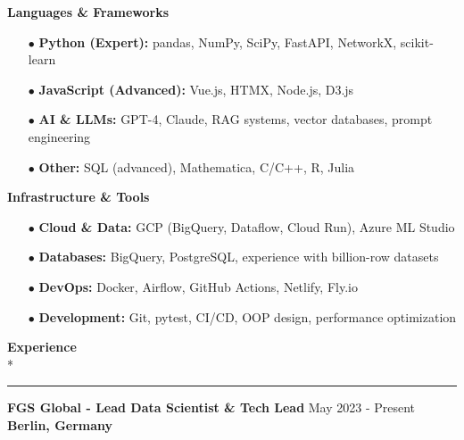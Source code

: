 \documentclass[11pt,a4paper]{article}
\newlength{\spacesm}    \setlength{\spacesm}{11pt}     %
\newlength{\spacexl}    \setlength{\spacexl}{38pt}     %
\newcommand{\bodytext}[1]{%
    {\fontsize{10pt}{14pt}\selectfont\color{charcoal} #1}%
}
\newcommand{\bodytextbold}[1]{%
    {\fontsize{10pt}{14pt}\selectfont\color{charcoal}\bfseries #1}%
}
\newcommand{\microtext}[1]{%
    {\fontsize{8pt}{11pt}\selectfont\color{mediumgray} #1}%
}
\newcommand{\sectiontitle}[1]{%
    \needspace{4\baselineskip}%
    \vspace{\spacexl}%
    {\fontsize{12pt}{14pt}\selectfont\color{navy}\bfseries #1}\\*%
    \vspace{1pt}%
    {\color{coral}\rule{20pt}{1pt}}%
    \vspace{0pt}%
}
\newcommand{\coralbullet}{{\color{coral}$\bullet$}\space}
\newcommand{\jobduration}[1]{%
    {\fontspec{JetBrains Mono}\microtext{#1}}
}
\newcommand{\companyname}[1]{%
    {\color{darkgray}\bfseries #1}
}
\begin{document}
\setlength{\multicolsep}{0pt}
\begin{multicols}{2}
\raggedcolumns
\bodytextbold{Languages \& Frameworks}
\vspace{2pt}
\begin{itemize}[leftmargin=15pt,itemindent=0pt,labelwidth=10pt,labelsep=5pt,itemsep=1pt,parsep=0pt,topsep=0pt,partopsep=0pt]
    \item[\coralbullet] \bodytext{\textbf{Python (Expert):} pandas, NumPy, SciPy, FastAPI, NetworkX, scikit-learn}
    \item[\coralbullet] \bodytext{\textbf{JavaScript (Advanced):} Vue.js, HTMX, Node.js, D3.js}
    \item[\coralbullet] \bodytext{\textbf{AI \& LLMs:} GPT-4, Claude, RAG systems, vector databases, prompt engineering}
    \item[\coralbullet] \bodytext{\textbf{Other:} SQL (advanced), Mathematica, C/C++, R, Julia}
\end{itemize}

\columnbreak

\bodytextbold{Infrastructure \& Tools}
\vspace{2pt}
\begin{itemize}[leftmargin=15pt,itemindent=0pt,labelwidth=10pt,labelsep=5pt,itemsep=1pt,parsep=0pt,topsep=0pt,partopsep=0pt]
    \item[\coralbullet] \bodytext{\textbf{Cloud \& Data:} GCP (BigQuery, Dataflow, Cloud Run), Azure ML Studio}
    \item[\coralbullet] \bodytext{\textbf{Databases:} BigQuery, PostgreSQL, experience with billion-row datasets}
    \item[\coralbullet] \bodytext{\textbf{DevOps:} Docker, Airflow, GitHub Actions, Netlify, Fly.io}
    \item[\coralbullet] \bodytext{\textbf{Development:} Git, pytest, CI/CD, OOP design, performance optimization}
\end{itemize}
\end{multicols}

\sectiontitle{Experience}
\vspace{\spacesm}

\bodytext{\textbf{FGS Global - Lead Data Scientist \& Tech Lead}} \hfill \jobduration{May 2023 - Present}\\
\companyname{Berlin, Germany}
\end{document}
